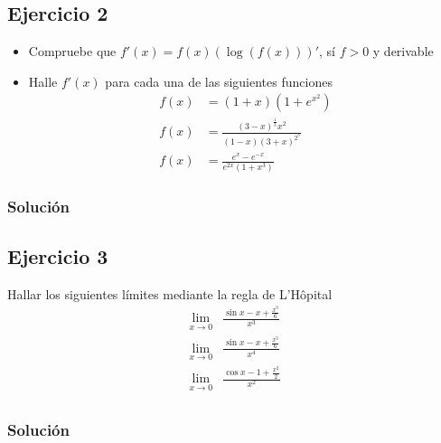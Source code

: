 \documentclass[a4paper]{article}
\begin{document}
\subsection{Ejercicio 2}
\noindent
\begin{itemize}
    \item Compruebe que \(f'(x) = f(x)\left(\log{\left(f(x)\right)}\right)'\), sí \(f > 0\)
    y derivable
    \item Halle \(f'(x)\) para cada una de las siguientes funciones
    \begin{align*}
        f(x) &= \left(1 + x\right)\left(1 + e^{x^2}\right) \\
        f(x) &= \frac{(3 - x)^{\frac{1}{3}}x^2}{(1 - x)(3 + x)^{2^{3}}} \\
        f(x) &= \frac{e^{x} - e^{-x}}{e^{2x}(1 + x^3)}
    \end{align*}
\end{itemize}
\subsubsection*{Solución}
\subsection{Ejercicio 3}
\noindent
Hallar los siguientes límites mediante la regla de L'Hôpital
\begin{align*}
    \lim_{x \to 0} &\frac{\sin{x} - x + \frac{x^3}{6}}{x^3} \\
    \lim_{x \to 0} &\frac{\sin{x} - x + \frac{x^3}{6}}{x^4} \\
    \lim_{x \to 0} &\frac{\cos{x} - 1 + \frac{x^2}{2}}{x^2} \\
\end{align*}
\subsubsection*{Solución}
\end{document}
